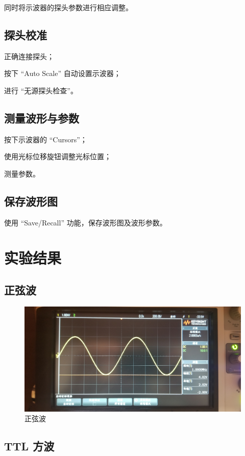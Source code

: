\documentclass[a4paper]{article}
\begin{document}
		\par 同时将示波器的探头参数进行相应调整。

	\subsection{探头校准}

		\par 正确连接探头；
		\par 按下 “Auto Scale” 自动设置示波器；
		\par 进行 “无源探头检查”。

	\subsection{测量波形与参数}

		\par 按下示波器的 “Cursors”；
		\par 使用光标位移旋钮调整光标位置；
		\par 测量参数。

	\subsection{保存波形图}

		\par 使用 “Save/Recall” 功能，保存波形图及波形参数。

\section{实验结果}

	\subsection{正弦波}

	\begin{figure}[H]
		\centering
		\includegraphics[width=0.7\linewidth]{figures/f1}
		\caption{正弦波}
	\end{figure}

	\subsection{TTL 方波}
\end{document}
